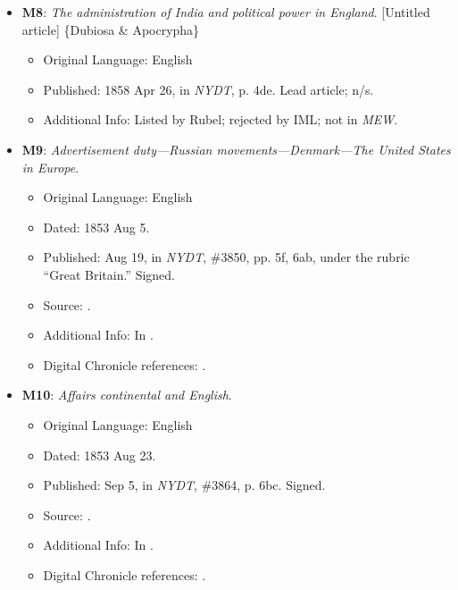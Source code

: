 \begin{itemize}
    \item \textbf{M8}: \textit{The administration of India and political power in England}. [Untitled article] \{Dubiosa \& Apocrypha\}
    \begin{itemize}
        \item Original Language: English
        \item Published: 1858 Apr 26, in \textit{NYDT}, p. 4de. Lead article; n/s.
        \item Additional Info: Listed by Rubel; rejected by IML; not in \textit{MEW}.
    \end{itemize}

    \item \textbf{M9}: \textit{Advertisement duty—Russian movements—Denmark—The United States in Europe}.
    \begin{itemize}
        \item Original Language: English
        \item Dated: 1853 Aug 5.
        \item Published: Aug 19, in \textit{NYDT}, \#3850, pp. 5f, 6ab, under the rubric ``Great Britain.'' Signed.
        \item Source: .
        \item Additional Info: In .
        \item Digital Chronicle references: .
    \end{itemize}

    \item \textbf{M10}: \textit{Affairs continental and English}.
    \begin{itemize}
        \item Original Language: English
        \item Dated: 1853 Aug 23.
        \item Published: Sep 5, in \textit{NYDT}, \#3864, p. 6bc. Signed.
        \item Source: .
        \item Additional Info: In .
        \item Digital Chronicle references: .
    \end{itemize}


\end{itemize}
